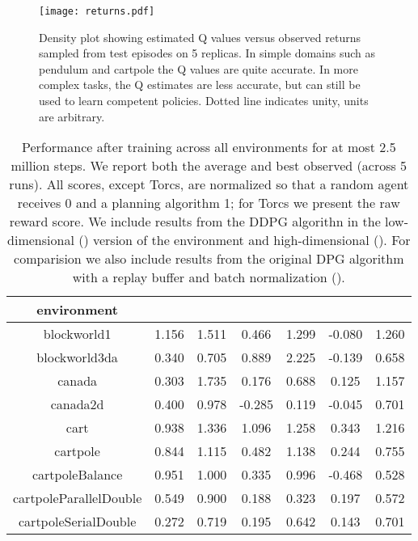 \documentclass{article} \usepackage{iclr2016_conference,times}
\begin{document}
\begin{figure}[h]
\begin{center}
  \texttt{[image: returns.pdf]}
\end{center}
\caption{ Density plot showing estimated Q values
  versus observed returns sampled from test episodes
  on 5 replicas.
  In simple domains such as
  pendulum and cartpole the Q values are
  quite accurate. In more complex tasks, the Q estimates are less accurate, but
  can still be used to learn competent policies. Dotted line
  indicates unity, units are arbitrary.
}
\label{fig:returns}
\end{figure}





\begin{table}[t]
  \caption{ Performance after training across all environments for at most 2.5
    million steps.  We report both the average and best observed
    (across 5 runs). All scores, except Torcs, are normalized so that
    a random agent receives 0 and a planning algorithm 1; for Torcs we
    present the raw reward score. We include results from the DDPG algorithn
    in the low-dimensional
    () version of the environment and high-dimensional (). For comparision
    we also include results from the original DPG algorithm with a replay
    buffer and batch normalization ().
} \label{table:results}
\label{eval-table}
\begin{center}
  \begin{tabular}{ c | c | c | c | c | c | c }
    environment &  &  & 
    &  &  & \\
    \hline
      blockworld1 & 1.156 & 1.511 & 0.466 & 1.299 &  -0.080 & 1.260 \\
blockworld3da & 0.340 & 0.705 & 0.889 & 2.225 & -0.139 & 0.658 \\
canada & 0.303 & 1.735 & 0.176 & 0.688 & 0.125 & 1.157 \\
canada2d & 0.400 & 0.978 & -0.285 & 0.119 & -0.045 & 0.701 \\
cart & 0.938 & 1.336 & 1.096 & 1.258 & 0.343 & 1.216 \\
cartpole & 0.844 & 1.115 & 0.482 & 1.138 & 0.244 & 0.755 \\
cartpoleBalance & 0.951 & 1.000 & 0.335 & 0.996 & -0.468 & 0.528 \\
cartpoleParallelDouble & 0.549 & 0.900 & 0.188 & 0.323 & 0.197 & 0.572 \\
cartpoleSerialDouble & 0.272 & 0.719 & 0.195 & 0.642 & 0.143 & 0.701 \\

\end{tabular}
\end{center}
\end{table}
\end{document}
